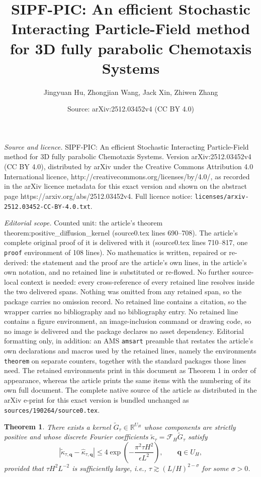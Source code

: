 \documentclass[10pt,a4paper]{amsart}
\title{SIPF-PIC: An efficient Stochastic Interacting Particle-Field method for 3D fully parabolic Chemotaxis Systems}
\author{Jingyuan Hu, Zhongjian Wang, Jack Xin, Zhiwen Zhang}
\date{Source: arXiv:2512.03452v4 (CC BY 4.0)}
\newtheorem{theorem}{Theorem}
\begin{document}
\maketitle

\noindent\emph{Source and licence.} SIPF-PIC: An efficient Stochastic Interacting Particle-Field method for 3D fully parabolic Chemotaxis Systems. Version arXiv:2512.03452v4 (CC BY 4.0), distributed by arXiv under the Creative Commons Attribution 4.0 International licence, http://creativecommons.org/licenses/by/4.0/, as recorded in the arXiv licence metadata for this exact version and shown on the abstract page https://arxiv.org/abs/2512.03452v4. Full licence notice: \texttt{licenses/arxiv-2512.03452-CC-BY-4.0.txt}.\par\smallskip

\noindent\textit{Editorial scope.} Counted unit: the article's theorem theorem:positive\_diffusion\_kernel (source0.tex lines 690--708). The article's complete original proof of it is delivered with it (source0.tex lines 710--817, one \texttt{proof} environment of 108 lines). No mathematics is written, repaired or re-derived: the statement and the proof are the article's own lines, in the article's own notation, and no retained line is substituted or re-flowed.  No further source-local context is needed: every cross-reference of every retained line resolves inside the two delivered spans.  Nothing was omitted from any retained span, so the package carries no omission record.  No retained line contains a citation, so the wrapper carries no bibliography and no bibliography entry.  No retained line contains a figure environment, an image-inclusion command or drawing code, so no image is delivered and the package declares no asset dependency.  Editorial formatting only, in addition: an AMS \texttt{amsart} preamble that restates the article's own declarations and macros used by the retained lines, namely the environments \texttt{theorem} on separate counters, together with the standard packages those lines need.  The retained environments print in this document as Theorem 1 in order of appearance, whereas the article prints the same items with the numbering of its own full document.  The complete native source of the article as distributed in the arXiv e-print for this exact version is bundled unchanged as \texttt{sources/190264/source0.tex}.
\begin{theorem}
\label{theorem:positive_diffusion_kernel}
There exists a kernel
$\widetilde{G}_{\tau}\in\mathbb{R}^{U_H}$ whose components are strictly positive and whose discrete Fourier coefficients
$\widetilde{\kappa}_{\tau}=\mathcal{F}_H\widetilde{G}_{\tau}$ satisfy
\begin{equation}
\left|
\widetilde{\kappa}_{\tau,\mathbf q}
-
\hat{\kappa}_{\tau,\mathbf q}
\right|
\leq
4\exp\left(
-\frac{\pi^2\tau H^2}{\epsilon L^2}
\right),
\qquad \mathbf q\in U_H,
\end{equation}
provided that $\tau H^2L^{-2}$ is sufficiently large, i.e., $\tau\gtrsim (L/H)^{2-\sigma}$ for some $\sigma>0$.
\end{theorem}
\end{document}
